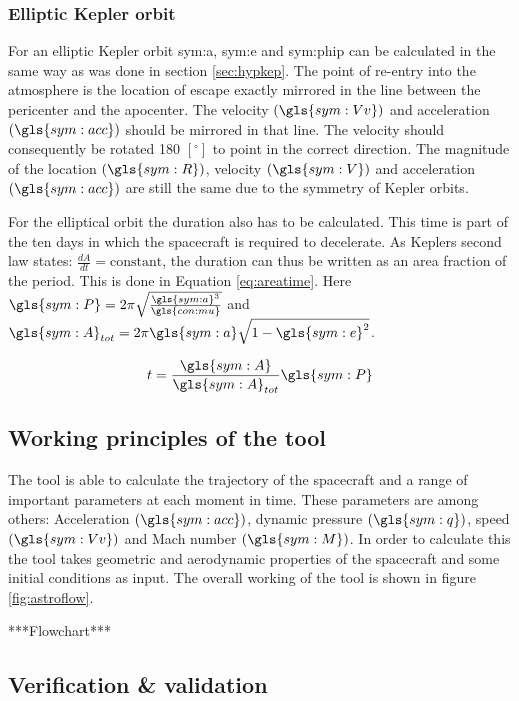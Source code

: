 \subsubsection{Elliptic Kepler orbit}
 \label{sec:eliptickep}
For an elliptic Kepler orbit \gls{sym:a}, \gls{sym:e} and \gls{sym:phip} can be calculated in the same way as was done in section \ref{sec:hypkep}. The point of re-entry into the atmosphere is the location of escape exactly mirrored in the line between the pericenter and the apocenter. The velocity $\left(\gls{sym:Vv}\right)$ and  acceleration $\left(\gls{sym:acc}\right)$  should be mirrored in that line. The velocity should consequently be rotated 180 $\left[^\circ\right]$ to point in the correct direction. The magnitude of the location $\left(\gls{sym:R}\right)$, velocity $\left(\gls{sym:V}\right)$ and acceleration $\left(\gls{sym:acc}\right)$ are still the same due to the symmetry of Kepler orbits.

For the elliptical orbit the duration also has to be calculated. This time is part of the ten days in which the spacecraft is required to decelerate. As Keplers second law states: $\frac{dA}{dt}=\mbox{constant}$, the duration can thus be written as an area fraction of the period. This is done in Equation \ref{eq:areatime}. Here $\gls{sym:P} = 2\pi\sqrt{\frac{\gls{sym:a}^3}{\gls{con:mu}}}$ and $\gls{sym:A}_{tot} = 2\pi \gls{sym:a} \sqrt{1-\gls{sym:e}^2}$.

\begin{equation}
t = \frac{\gls{sym:A}}{\gls{sym:A}_{tot}}\gls{sym:P}
\label{eq:areatime}
\end{equation}

\subsection{Working principles of the tool}
\label{sec:astrowp}
The tool is able to calculate the trajectory of the spacecraft and a range of important parameters at each moment in time. These parameters are among others: Acceleration $\left(\gls{sym:acc}\right)$, dynamic pressure $\left(\gls{sym:q}\right)$, speed $\left(\gls{sym:Vv}\right)$ and Mach number $\left(\gls{sym:M}\right)$. In order to calculate this the tool takes geometric and aerodynamic properties of the spacecraft and some initial conditions as input. The overall working of the tool is shown in figure \ref{fig:astroflow}.

***Flowchart***\\

\subsection{Verification \& validation}
\label{sec:astrovv}

